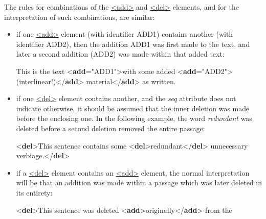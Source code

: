 The rules for combinations of the \hyperref[TEI.add]{<add>} and \hyperref[TEI.del]{<del>} elements, and for the interpretation of such combinations, are similar:\begin{itemize}
\item if one \hyperref[TEI.add]{<add>} element (with identifier \textsf{ADD1}) contains another (with identifier \textsf{ADD2}), then the addition \textsf{ADD1} was first made to the text, and later a second addition (\textsf{ADD2}) was made within that added text: \par\bgroup{}\exampleFont \begin{shaded}\noindent\mbox{}This is the text {<\textbf{add}\hspace*{1em}{xml:id}="{ADD1}">}with some added {<\textbf{add}\hspace*{1em}{xml:id}="{ADD2}">}(interlinear!){</\textbf{add}>} material{</\textbf{add}>} as\mbox{}\newline 
 written.\end{shaded}\egroup\par 
\item if one \hyperref[TEI.del]{<del>} element contains another, and the {\itshape seq} attribute does not indicate otherwise, it should be assumed that the inner deletion was made before the enclosing one. In the following example, the word \textit{redundant} was deleted before a second deletion removed the entire passage: \par\bgroup{}\exampleFont \begin{shaded}\noindent\mbox{}{<\textbf{del}>}This\mbox{}\newline 
 sentence contains some {<\textbf{del}>}redundant{</\textbf{del}>} unnecessary\mbox{}\newline 
 verbiage.{</\textbf{del}>}\end{shaded}\egroup\par 
\item if a \hyperref[TEI.del]{<del>} element contains an \hyperref[TEI.add]{<add>} element, the normal interpretation will be that an addition was made within a passage which was later deleted in its entirety: \par\bgroup{}\exampleFont \begin{shaded}\noindent\mbox{}{<\textbf{del}>}This\mbox{}\newline 
 sentence was deleted {<\textbf{add}>}originally{</\textbf{add}>} from the\mbox{}\newline 

\end{shaded}
\end{itemize}
